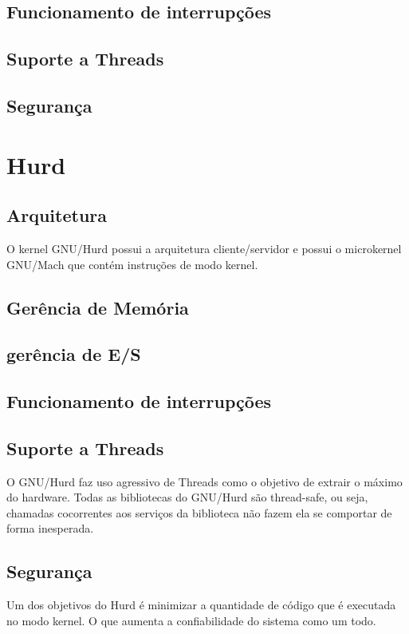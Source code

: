 \documentclass[conference]{IEEEtran}
\begin{document}
\subsection{Funcionamento de interrupções}\label{sec:BSDInt}

\subsection{Suporte a Threads}\label{sec:BSDThreads}

\subsection{Segurança}\label{sec:BSDSec}

\section{Hurd}\label{sec:Hurd}

\subsection{Arquitetura}\label{sec:HurdArq}
O kernel GNU/Hurd possui a arquitetura cliente/servidor e possui o microkernel GNU/Mach que contém instruções de modo kernel.

\subsection{Gerência de Memória}\label{sec:HurdMem}

\subsection{gerência de E/S}\label{sec:HurdES}

\subsection{Funcionamento de interrupções}\label{sec:HurdInt}

\subsection{Suporte a Threads}\label{sec:HurdThreads}
O GNU/Hurd faz uso agressivo de Threads como o objetivo de extrair o máximo do hardware.\cite{Hurd} Todas as bibliotecas do GNU/Hurd são thread-safe, ou seja, chamadas cocorrentes aos serviços da biblioteca não fazem ela se comportar de forma inesperada.

\subsection{Segurança}\label{sec:HurdSec}
Um dos objetivos do Hurd é minimizar a quantidade de código que é executada no modo kernel. O que aumenta a confiabilidade do sistema como um todo.



\end{document}
